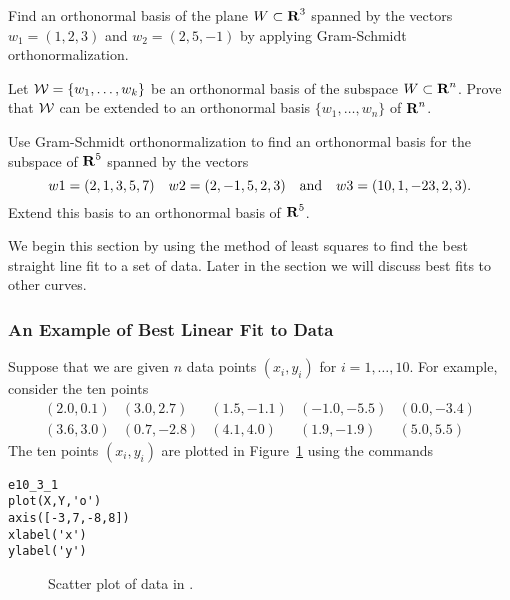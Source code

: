 \begin{exercise} \label{c7.5.2}
Find an orthonormal basis of the plane $W\subset\mbox{$\bf{R}$}^3$ spanned by the
vectors $w_1=(1,2,3)$ and $w_2=(2,5,-1)$ by applying Gram-Schmidt
orthonormalization.
\end{exercise}

\begin{exercise} \label{c7.5.3}
Let ${\cal W}=\{w_1,\ldots,w_k\}$ be an orthonormal basis of the subspace
$W\subset\mbox{$\bf{R}$}^n$.  Prove that ${\cal W}$ can be extended to an orthonormal
basis $\{w_1,\ldots,w_n\}$ of $\mbox{$\bf{R}$}^n$.
\end{exercise}

\CEXER

\begin{exercise} \label{c7.5.4}
Use Gram-Schmidt orthonormalization to find an orthonormal basis for the
subspace of $\mbox{$\bf{R}$}^5$ spanned by the vectors
\begin{equation*}
w1 = (2,1,3,5,7) \quad w2 = (2,-1,5,2,3) \quad\mbox{and}\quad w3 = (10,1,-23,2,3).
\end{equation*}
Extend this basis to an orthonormal basis of $\mbox{$\bf{R}$}^5$.
\end{exercise}




 \label{S:7.6}

We begin this section by using the method of least squares to find the
best straight line fit to a set of data.  Later in the section we will
discuss best fits to other curves.

\subsubsection*{An Example of Best Linear Fit to Data}

Suppose that we are given $n$ data points
$(x_i,y_i)$ for $i=1,\ldots,10$.
For example, consider the ten points
\begin{equation*}  \label{E:scatterdata}
\begin{array}{ccccc}
(2.0,0.1) & (3.0,2.7) & (1.5,-1.1) & (-1.0,-5.5) & (0.0,-3.4)\\
(3.6,3.0) & (0.7,-2.8) & (4.1,4.0) & (1.9,-1.9) & (5.0,5.5) \end{array}
\end{equation*}
The ten points $(x_i,y_i)$ are plotted in Figure~\ref{F:linreg} using the
commands
\begin{verbatim}
e10_3_1
plot(X,Y,'o')
axis([-3,7,-8,8])
xlabel('x')
ylabel('y')
\end{verbatim}
\begin{figure}[htb]
     \centerline{%
     }
     \caption{Scatter plot of data in \protect{}.}
     \label{F:linreg}
\end{figure}

